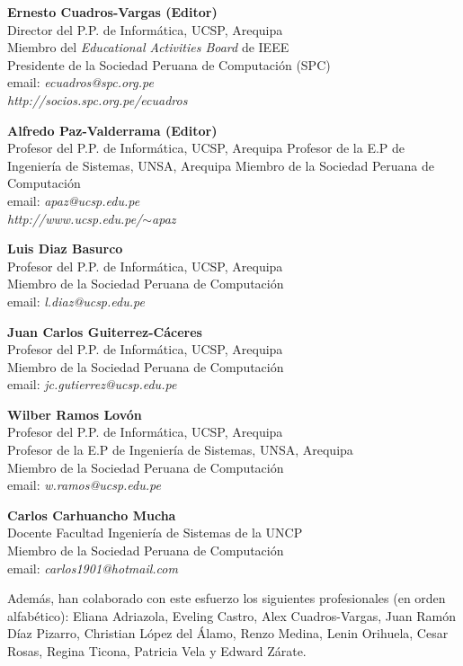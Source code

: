 \begin{center}
\textbf{Ernesto Cuadros-Vargas (Editor)}\\
Director del P.P. de Informática, UCSP, Arequipa\\
Miembro del \textit{Educational Activities Board} de IEEE\\
Presidente de la Sociedad Peruana de Computación (SPC)\\
email: \textit{ecuadros@spc.org.pe}\\
\textit{http://socios.spc.org.pe/ecuadros}
\end{center}

\begin{center}
\textbf{Alfredo Paz-Valderrama (Editor)}\\
Profesor del P.P. de Informática, UCSP, Arequipa
Profesor de la E.P de Ingeniería de Sistemas, UNSA, Arequipa
Miembro de la Sociedad Peruana de Computación\\
email: \textit{apaz@ucsp.edu.pe}\\
\textit{http://www.ucsp.edu.pe/$\sim$apaz}
\end{center}

\begin{center}
\textbf{Luis Diaz Basurco}\\
Profesor del P.P. de Informática, UCSP, Arequipa\\
Miembro de la Sociedad Peruana de Computación\\
email: \textit{l.diaz@ucsp.edu.pe}
\end{center}

\begin{center}
\textbf{Juan Carlos Guiterrez-Cáceres}\\
Profesor del P.P. de Informática, UCSP, Arequipa\\
Miembro de la Sociedad Peruana de Computación\\
email: \textit{jc.gutierrez@ucsp.edu.pe}
\end{center}

\begin{center}
\textbf{Wilber Ramos Lovón}\\
Profesor del P.P. de Informática, UCSP, Arequipa\\
Profesor de la E.P de Ingeniería de Sistemas, UNSA, Arequipa\\
Miembro de la Sociedad Peruana de Computación\\
email: \textit{w.ramos@ucsp.edu.pe}
\end{center}

\begin{center}
\textbf{Carlos Carhuancho Mucha}\\
Docente Facultad Ingeniería de Sistemas de la UNCP\\
Miembro de la Sociedad Peruana de Computación\\
email: \textit{carlos1901@hotmail.com}
\end{center}

Además, han colaborado con este esfuerzo los siguientes profesionales (en orden alfabético): Eliana Adriazola, Eveling Castro, Alex Cuadros-Vargas, Juan Ramón Díaz Pizarro, Christian López del Álamo, Renzo Medina, Lenin Orihuela, Cesar Rosas, Regina Ticona, Patricia Vela y Edward Zárate.
\newpage